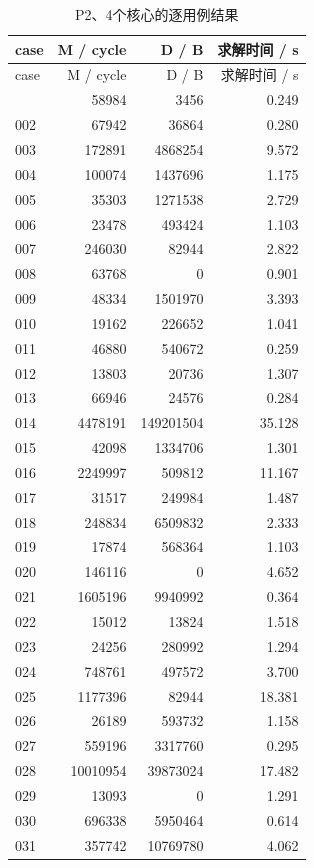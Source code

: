 \documentclass[anonymous,notoc]{gmcm2026}
\begin{document}
\begin{longtable}{lrrr}
\caption{P2、4个核心的逐用例结果}\\
\toprule
case & M / cycle & D / B & 求解时间 / s\\\midrule
\endfirsthead
\toprule
case & M / cycle & D / B & 求解时间 / s\\\midrule
\endhead
\bottomrule\endfoot
001 & 58984 & 3456 & 0.249 \\
002 & 67942 & 36864 & 0.280 \\
003 & 172891 & 4868254 & 9.572 \\
004 & 100074 & 1437696 & 1.175 \\
005 & 35303 & 1271538 & 2.729 \\
006 & 23478 & 493424 & 1.103 \\
007 & 246030 & 82944 & 2.822 \\
008 & 63768 & 0 & 0.901 \\
009 & 48334 & 1501970 & 3.393 \\
010 & 19162 & 226652 & 1.041 \\
011 & 46880 & 540672 & 0.259 \\
012 & 13803 & 20736 & 1.307 \\
013 & 66946 & 24576 & 0.284 \\
014 & 4478191 & 149201504 & 35.128 \\
015 & 42098 & 1334706 & 1.301 \\
016 & 2249997 & 509812 & 11.167 \\
017 & 31517 & 249984 & 1.487 \\
018 & 248834 & 6509832 & 2.333 \\
019 & 17874 & 568364 & 1.103 \\
020 & 146116 & 0 & 4.652 \\
021 & 1605196 & 9940992 & 0.364 \\
022 & 15012 & 13824 & 1.518 \\
023 & 24256 & 280992 & 1.294 \\
024 & 748761 & 497572 & 3.700 \\
025 & 1177396 & 82944 & 18.381 \\
026 & 26189 & 593732 & 1.158 \\
027 & 559196 & 3317760 & 0.295 \\
028 & 10010954 & 39873024 & 17.482 \\
029 & 13093 & 0 & 1.291 \\
030 & 696338 & 5950464 & 0.614 \\
031 & 357742 & 10769780 & 4.062 \\

\end{longtable}
\end{document}

